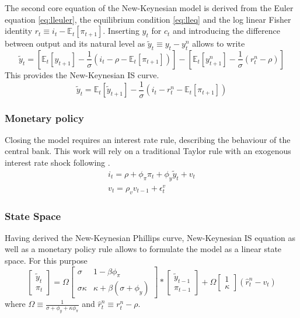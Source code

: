 \documentclass[12pt,a4paper,english]{article} %
\newcommand{\E}{\mathbb{E}} %
\begin{document}
	The second core equation of the New-Keynesian model is derived from the Euler equation \ref{eq:lleuler}, the equilibrium condition \ref{eq:lleq} and the log linear Fisher identity $r_t \equiv i_t - \E_t[\pi_{t+1}]$. Inserting $y_t$ for $c_t$ and introducing the difference between output and its natural level as $\tilde{y}_t \equiv y_t - y_t^n$ allows to write
	\begin{equation}
		\tilde{y}_t = 
		\left[
		\E_t[y_{t+1}] - \frac{1}{\sigma} (i_t - \rho - \E_t[\pi_{t+1}])
		\right]
		-
		\left[
		\E_t[y_{t+1}^n] - \frac{1}{\sigma} (r_t^n - \rho)
		\right]
	\end{equation}
	This provides the New-Keynesian IS curve.
	\begin{equation} \label{eq:llnkis}
		\tilde{y}_t = \E_t[\tilde{y}_{t+1}] - \frac{1}{\sigma} (i_t - r_t^n - \E_t[\pi_{t+1}])
	\end{equation}
	\subsubsection{Monetary policy}
	Closing the model requires an interest rate rule, describing the behaviour of the central bank. This work will rely on a traditional Taylor rule with an exogenous interest rate shock following \cite{gali_monetary_2008}.
	\begin{equation}
		\begin{aligned}
			i_t = \rho + \phi_{\pi} \pi_t + \phi_{y} \tilde{y}_t + v_t \\
			v_t = \rho_v v_{t-1} + \epsilon_t^v
		\end{aligned}
	\end{equation}

	\subsubsection{State Space}
	Having derived the New-Keynesian Phillips curve, New-Keynesian IS equation as well as a monetary policy rule allows to formulate the model as a linear state space. For this purpose 
	\begin{equation}
		\begin{bmatrix}
			\tilde{y}_t \\
			\pi_t
		\end{bmatrix}
		=
		\Omega
		\begin{bmatrix}
			\sigma & 1 - \beta \phi_{\pi} \\
			\sigma \kappa & \kappa + \beta (\sigma + \phi_y)
		\end{bmatrix}
		*
		\begin{bmatrix}
			\tilde{y}_{t-1} \\
			\pi_{t-1}
		\end{bmatrix}
		+
		\Omega
		\begin{bmatrix}
			1 \\
			\kappa
		\end{bmatrix}	
		(\hat{r}_t^n - v_t)
	\end{equation}
	where $\Omega \equiv \frac{1}{\sigma + \phi_y + \kappa \phi_{\pi}}$ and $\hat{r}_t^n \equiv r_t^n - \rho$.
	
\end{document}
